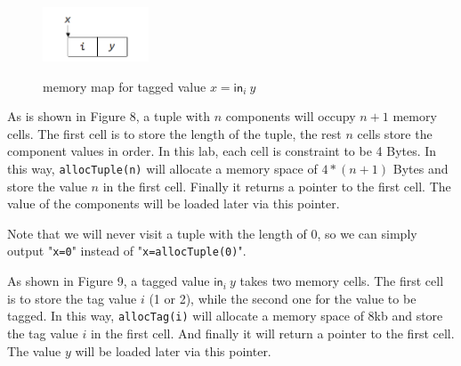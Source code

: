 \documentclass{article}
\theoremstyle{definition}
\theoremstyle{remark}
\numberwithin{equation}{section}
\begin{document}
\begin{figure}
  \centering
  \includegraphics[width=0.28\textwidth]{tag.png}\\
  \caption{memory map for tagged value $x=\textsf{in}_i\ y$}\label{fig:digit}
\end{figure}

As is shown in Figure 8, a tuple with $n$ components will occupy $n+1$ memory
cells. The first cell is to store the length of the tuple, the rest $n$ cells
store the component values in order. In this lab, each cell is constraint to be 4 Bytes.
In this way, \texttt{allocTuple(n)} will allocate a memory space of $4*(n+1)$ Bytes
and store the value $n$ in the first cell. Finally it returns a pointer to
the first cell. The value of the components will be loaded later via this
pointer.

Note that we will never visit a tuple with the length of 0, so we can simply
output "\texttt{x=0}" instead of "\texttt{x=allocTuple(0)}".

As shown in Figure 9, a tagged value $\textsf{in}_i\ y$ takes two memory
cells. The first cell is to store the tag value $i$ (1 or 2), while the second
one for the value to be tagged.
In this way, \texttt{allocTag(i)} will allocate a memory space of 8kb
and store the tag value $i$ in the first cell. And finally it will return a pointer to
the first cell. The value $y$ will be loaded later via this pointer.\\
\end{document}
